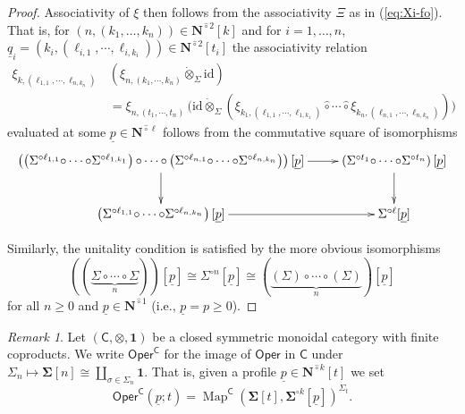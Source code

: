 \documentclass[11pt]{amsart}
\theoremstyle{definition}
\theoremstyle{remark}
\newtheorem{remark}[subsection]{Remark}
\newcommand{\Oper}{\mathsf{Oper}}
\newcommand{\Map}{\operatorname{Map}}
\newcommand{\id}{\mathrm{id}}
\newcommand{\Ncirc}[1]{\mathbf{N}^{\hat{\circ}#1}}
\newcommand{\circhat}{\hat{\circ}}
\newcommand{\tensordot}{\dot{\otimes}}
\begin{document}
\begin{proof}
Associativity of $\xi$ then follows from the associativity $\Xi$ as in (\ref{eq:Xi-fo}). That is, for $(n,(k_1,\dots,k_n))\in \Ncirc{2}[k]$ and for $i=1,\dots,n$, $\underline{q}_i=(k_i,(\ell_{i,1},\cdots,\ell_{i,k_i})) \in \Ncirc{2}[t_i]$ %
the associativity relation \begin{align*}
     \xi_{k,(\ell_{1,1},\cdots, \ell_{n,k_n})}\,& ( \xi_{n,(k_1,\cdots,k_n)} \tensordot_{\Sigma} \id) \\
     &=\xi_{n,(t_1,\cdots,t_n)} \, \big(\id \tensordot_{\Sigma}  (\xi_{k_1,(\ell_{1,1},\cdots,\ell_{1,k_1})} \circhat \cdots \circhat \xi_{k_n,(\ell_{n,1},\cdots,\ell_{n,k_n})})\big)\end{align*}
evaluated at some $\underline{p}\in \Ncirc{\ell}$ follows from the commutative square of isomorphisms
\[ \xymatrix{
    \left(\left(\Sigma^{\circ \ell_{1,1}} {\circ} \cdots {\circ} \Sigma^{\circ \ell_{1,k_1}}\right){\circ} \cdots {\circ} \left(\Sigma^{\circ \ell_{n,1}} {\circ} \cdots {\circ} \Sigma^{\circ \ell_{n,k_n}}\right)\right) [\underline{p}] \ar[r] \ar[d] 
    & 
    \left(\Sigma^{\circ t_1} {\circ} \cdots {\circ} \Sigma^{\circ t_n}\right) [\underline{p}] \ar[d]
    \\
    \left( \Sigma^{\circ \ell_{1,1}} {\circ}  \cdots {\circ} \Sigma^{\circ \ell_{n,k_n}}\right)[\underline{p}] \ar[r]
    &
    \Sigma^{\circ \ell}[\underline{p}]
}\]

Similarly, the unitality condition is satisfied by the more obvious isomorphisms \[ \left( ( \underbrace{\Sigma \circ \cdots \circ \Sigma}_{n}) \right)[\underline{p}] \cong \Sigma^{\circ n}[\underline{p}] \cong \left( \underbrace{(\Sigma) \circ \cdots \circ (\Sigma)}_{n} \right)[\underline{p}]\] for all $n\geq 0$ and $\underline{p}\in \Ncirc{1}$ (i.e., $\underline{p}=p\geq 0$). 
\end{proof} 

\begin{remark}
    Let $(\mathsf{C},\otimes, \mathbf{1})$ be a closed symmetric monoidal category with finite coproducts. We write $\Oper^{\mathsf{C}}$ for the image of $\Oper$ in $\mathsf{C}$ under $\Sigma_n\mapsto \mathbf{\Sigma}[n]\cong \coprod_{\sigma\in \Sigma_n} \mathbf{1}$. That is, given a profile $\underline{p}\in \Ncirc{k}[t]$ we set \[ \Oper^{\mathsf{C}}(\underline{p};t)= \Map^{\mathsf{C}}\left( \mathbf{\Sigma}[t], \mathbf{\Sigma}^{\circ k} [\underline{p}] \right)^{\Sigma_t}.\]
\end{remark}
\end{document}
